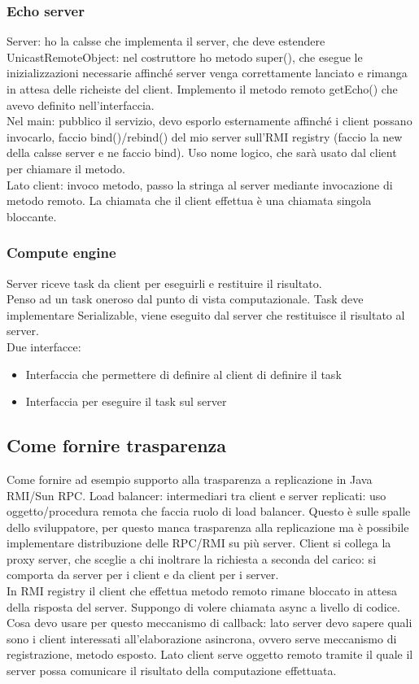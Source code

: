 \documentclass[16px]{article}
\begin{document}
\subsubsection{Echo server}
Server: ho la calsse che implementa il server, che deve estendere UnicastRemoteObject: nel costruttore ho metodo super(), che esegue le inizializzazioni necessarie affinché server venga correttamente lanciato e rimanga in attesa delle richeiste del client. Implemento il metodo remoto getEcho() che avevo definito nell'interfaccia.\\ Nel main: pubblico il servizio, devo esporlo esternamente affinché i client possano invocarlo, faccio bind()/rebind() del mio server sull'RMI registry (faccio la new della calsse server e ne faccio bind). Uso nome logico, che sarà usato dal client per chiamare il metodo.\\ Lato client: invoco metodo, passo la stringa al server mediante invocazione di metodo remoto. La chiamata che il client effettua è una chiamata singola bloccante.
\subsubsection{Compute engine}
Server riceve task da client per eseguirli e restituire il risultato.\\ Penso ad un task oneroso dal punto di vista computazionale. Task deve implementare Serializable, viene eseguito dal server che restituisce il risultato al server.\\ Due interfacce:
\begin{itemize}
\item Interfaccia che permettere di definire al client di definire il task
\item Interfaccia per eseguire il task sul server
\end{itemize}
\subsection{Come fornire trasparenza}
Come fornire ad esempio supporto alla trasparenza a replicazione in Java RMI/Sun RPC. Load balancer: intermediari tra client e server replicati: uso oggetto/procedura remota che faccia ruolo di load balancer. Questo è sulle spalle dello sviluppatore, per questo manca trasparenza alla replicazione ma è possibile implementare distribuzione delle RPC/RMI su più server. Client si collega la proxy server, che sceglie a chi inoltrare la richiesta a seconda del carico: si comporta da server per i client e da client per i server. \\ In RMI registry il client che effettua metodo remoto rimane bloccato in attesa della risposta del server. Suppongo di volere chiamata async a livello di codice.\\ Cosa devo usare per questo meccanismo di callback: lato server devo sapere quali sono i client interessati all'elaborazione asincrona, ovvero serve meccanismo di registrazione, metodo esposto. Lato client serve oggetto remoto tramite il quale il server possa comunicare il risultato della computazione effettuata.
\end{document}
